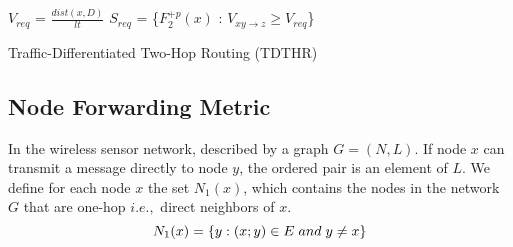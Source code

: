 \documentclass[fleqn,twoside]{article}
\begin{document}
\begin{algorithm}
\begin{footnotesize}
\BlankLine


$V_{req}$ = $\frac{dist(x,D)}{lt}$ \;
$S_{req}$ = \{$F_2^{+p}(x)$ : $V_{xy\rightarrow z} \geq V_{req}$\} \;
\caption{Traffic-Differentiated Two-Hop Routing (TDTHR)}
\label{algo:tdthr}
\end{footnotesize}
\end{algorithm}


\subsection{Node Forwarding Metric}
In the wireless sensor network, described by a graph $G=(N,L)$. If node $x$ 
can transmit a message directly to node $y$, the ordered pair is an element of $L$. We define for each node $x$ the set $N_1(x)$, which contains the nodes
in the network $G$ that are one-hop $i.e.,$ direct neighbors of $x$.
\begin{equation}
N_1(x) = \{y:(x;y) \in E \hspace{0.1cm} and \hspace{0.1cm} y \neq x\}
\label{eqn:Eq4}
\end{equation}
\end{document}
